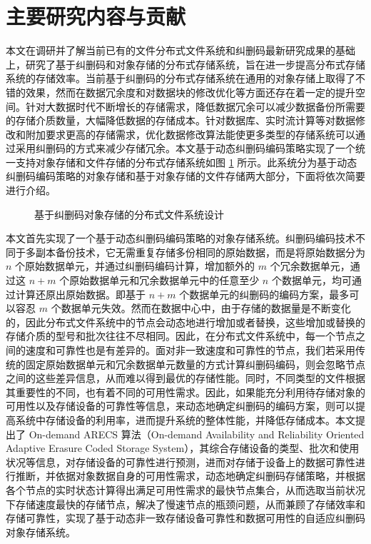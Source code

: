 \section{主要研究内容与贡献}
本文在调研并了解当前已有的文件分布式文件系统和纠删码最新研究成果的基础上，研究了基于纠删码和对象存储的分布式存储系统，旨在进一步提高分布式存储系统的存储效率。当前基于纠删码的分布式存储系统在通用的对象存储上取得了不错的效果，然而在数据冗余度和对数据块的修改优化等方面还存在着一定的提升空间。针对大数据时代不断增长的存储需求，降低数据冗余可以减少数据备份所需要的存储介质数量，大幅降低数据的存储成本。针对数据库、实时流计算等对数据修改和附加要求更高的存储需求，优化数据修改算法能使更多类型的存储系统可以通过采用纠删码的方式来减少存储冗余。本文基于动态纠删码编码策略实现了一个统一支持对象存储和文件存储的分布式存储系统如图 \ref{p2} 所示。此系统分为基于动态纠删码编码策略的对象存储和基于对象存储的文件存储两大部分，下面将依次简要进行介绍。

\begin{figure}[!htb]
\centering
\resizebox{.8\textwidth}{!}{}
\caption{基于纠删码对象存储的分布式文件系统设计}
\label{p2}
\end{figure}

本文首先实现了一个基于动态纠删码编码策略的对象存储系统。纠删码编码技术不同于多副本备份技术，它无需重复存储多份相同的原始数据，而是将原始数据分为 $n$ 个原始数据单元，并通过纠删码编码计算，增加额外的 $m$ 个冗余数据单元，通过这 $n+m$ 个原始数据单元和冗余数据单元中的任意至少 $n$ 个数据单元，均可通过计算还原出原始数据。即基于 $n+m$ 个数据单元的纠删码的编码方案，最多可以容忍 $m$ 个数据单元失效。然而在数据中心中，由于存储的数据量是不断变化的，因此分布式文件系统中的节点会动态地进行增加或者替换，这些增加或替换的存储介质的型号和批次往往不尽相同。因此，在分布式文件系统中，每一个节点之间的速度和可靠性也是有差异的。面对非一致速度和可靠性的节点，我们若采用传统的固定原始数据单元和冗余数据单元数量的方式计算纠删码编码，则会忽略节点之间的这些差异信息，从而难以得到最优的存储性能。同时，不同类型的文件根据其重要性的不同，也有着不同的可用性需求。因此，如果能充分利用待存储对象的可用性以及存储设备的可靠性等信息，来动态地确定纠删码的编码方案，则可以提高系统中存储设备的利用率，进而提升系统的整体性能，并降低存储成本。本文提出了 On-demand ARECS 算法（On-demand Availability and Reliability Oriented Adaptive Erasure Coded Storage System），其综合存储设备的类型、批次和使用状况等信息，对存储设备的可靠性进行预测，进而对存储于设备上的数据可靠性进行推断，并依据对象数据自身的可用性需求，动态地确定纠删码存储策略，并根据各个节点的实时状态计算得出满足可用性需求的最快节点集合，从而选取当前状况下存储速度最快的存储节点，解决了慢速节点的瓶颈问题，从而兼顾了存储效率和存储可靠性，实现了基于动态非一致存储设备可靠性和数据可用性的自适应纠删码对象存储系统。

